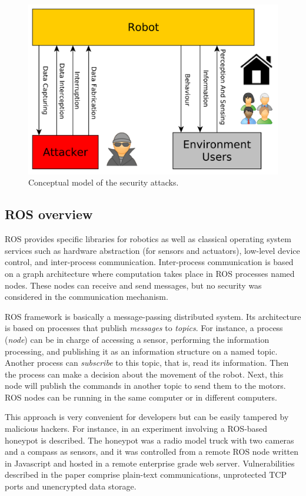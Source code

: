 \documentclass[journal,twoside]{JoPhA}
\begin{document}
\begin{figure}[ht]
    \centering
    \includegraphics[width=.5\textwidth]{RobotsAttacks.pdf}
    \caption{Conceptual model of the security attacks.}
  \label{fig:Conceptualmodel}
\end{figure}


\subsection{ROS overview}

ROS provides specific libraries for robotics as well as classical operating system services such as hardware abstraction (for sensors and actuators), low-level device control, and inter-process communication. Inter-process communication is based on a graph architecture where computation takes place in ROS processes named nodes. These nodes can receive and send messages, but no security was considered in the communication mechanism.

ROS framework is basically a message-passing distributed system. Its architecture is based on processes that publish {\em messages} to {\em topics}. For instance, a process ({\em node}) can be in charge of accessing a sensor, performing the information processing, and publishing it as an information structure on a named topic. Another process can {\em subscribe} to this topic, that is, read its information. Then the process can make a decision about the movement of the robot. Next, this node will publish the commands in another topic to send them to the motors. ROS nodes can be running in the same computer or in different computers.

This approach is very convenient for developers but can be easily tampered by malicious hackers. For instance, in \cite{McClean2013} an experiment involving a ROS-based honeypot is described. The honeypot was a radio model truck with two cameras and a compass as sensors, and it was controlled from a remote ROS node written in Javascript and hosted in a remote enterprise grade web server. Vulnerabilities described in the paper comprise plain-text communications, unprotected TCP ports and unencrypted data storage.
\end{document}
